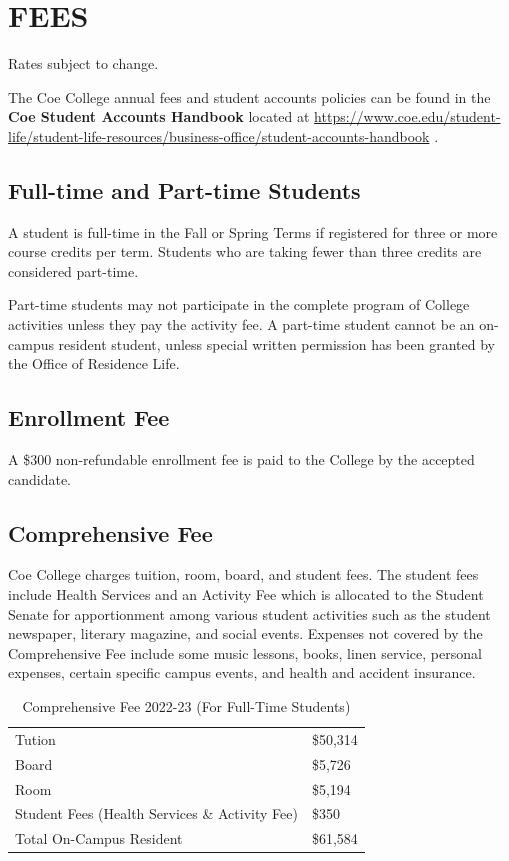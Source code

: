 \documentclass[
  letterpaper,
]{scrbook}
\renewcommand\toprule[2]\relax
\renewcommand\bottomrule[2]\relax
\begin{document}
\section{FEES}\label{fees}

Rates subject to change.

The Coe College annual fees and student accounts policies can be found
in the \textbf{Coe Student Accounts Handbook} located at
\url{https://www.coe.edu/student-life/student-life-resources/business-office/student-accounts-handbook}
.

\subsection{Full-time and Part-time
Students}\label{full-time-and-part-time-students}

A student is full-time in the Fall or Spring Terms if registered for
three or more course credits per term. Students who are taking fewer
than three credits are considered part-time.

Part-time students may not participate in the complete program of
College activities unless they pay the activity fee. A part-time student
cannot be an on-campus resident student, unless special written
permission has been granted by the Office of Residence Life.

\subsection{Enrollment Fee}\label{enrollment-fee}

A \$300 non-refundable enrollment fee is paid to the College by the
accepted candidate.

\subsection{Comprehensive Fee}\label{comprehensive-fee}

Coe College charges tuition, room, board, and student fees. The student
fees include Health Services and an Activity Fee which is allocated to
the Student Senate for apportionment among various student activities
such as the student newspaper, literary magazine, and social events.
Expenses not covered by the Comprehensive Fee include some music
lessons, books, linen service, personal expenses, certain specific
campus events, and health and accident insurance.

\begin{longtable}[]{@{}
  >{\raggedright\arraybackslash}p{}
  >{\raggedleft\arraybackslash}p{}@{}}
\caption{Comprehensive Fee 2022-23 (For Full-Time
Students)}\tabularnewline
\toprule\noalign{}
\endfirsthead
\endhead
\bottomrule\noalign{}
\endlastfoot
Tution & \$50,314 \\
Board & \$5,726 \\
Room & \$5,194 \\
Student Fees (Health Services \& Activity Fee) & \$350 \\
Total On-Campus Resident & \$61,584 \\
\end{longtable}
\end{document}
